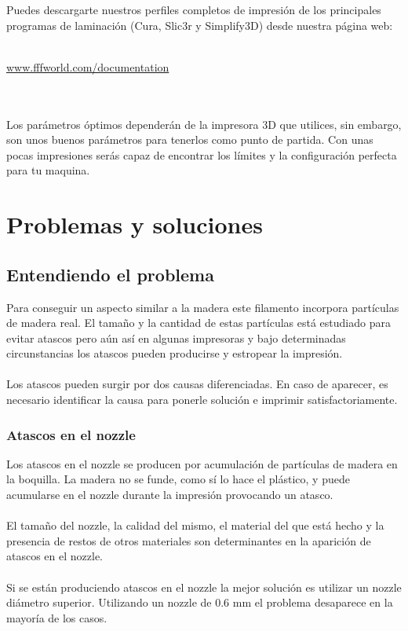 \documentclass[11pt,a4paper]{article}
\begin{document}
Puedes descargarte nuestros perfiles completos de impresión de los principales programas de laminación (Cura, Slic3r y Simplify3D) desde nuestra página web:
\\\\
\centerline{ {\huge \url{www.fffworld.com/documentation} } }
\\\\
Los parámetros óptimos dependerán de la impresora 3D que utilices, sin embargo, son unos buenos parámetros para tenerlos como punto de partida. Con unas pocas impresiones serás capaz de encontrar los límites y la configuración perfecta para tu maquina.
\section{Problemas y soluciones}
	\subsection{Entendiendo el problema}
Para conseguir un aspecto similar a la madera este filamento incorpora partículas de madera real. El tamaño y la cantidad de estas partículas está estudiado para evitar atascos pero aún así en algunas impresoras y bajo determinadas circunstancias los atascos pueden producirse y estropear la impresión.\\\\
Los atascos pueden surgir por dos causas diferenciadas. En caso de aparecer, es necesario identificar la causa para ponerle solución e imprimir satisfactoriamente.		\subsubsection{Atascos en el nozzle}
Los atascos en el nozzle se producen por acumulación de partículas de madera en la boquilla. La madera no se funde, como sí lo hace el plástico, y puede acumularse en el nozzle durante la impresión provocando un atasco.\\\\
El tamaño del nozzle, la calidad del mismo, el material del que está hecho y la presencia de restos de otros materiales son determinantes en la aparición de atascos en el nozzle.\\\\
Si se están produciendo atascos en el nozzle la mejor solución es utilizar un nozzle diámetro superior. Utilizando un nozzle de 0.6 mm el problema desaparece en la mayoría de los casos.\\\\
\end{document}
